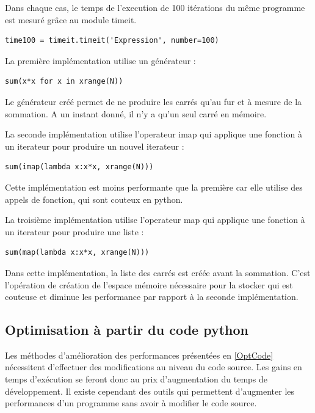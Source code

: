 \documentclass[a4paper]{article}
\begin{document}
Dans chaque cas, le temps de l'execution de 100 itérations du même programme est mesuré grâce au module timeit.

\begin{verbatim}
time100 = timeit.timeit('Expression', number=100)
\end{verbatim}

La première implémentation utilise un générateur :

\begin{verbatim}
sum(x*x for x in xrange(N))
\end{verbatim}

Le générateur créé permet de ne produire les carrés qu'au fur et à mesure de la sommation. A un instant donné, il n'y a qu'un seul carré en mémoire.


La seconde implémentation utilise l'operateur imap qui applique une fonction à un iterateur pour produire un nouvel iterateur :

\begin{verbatim}
sum(imap(lambda x:x*x, xrange(N)))
\end{verbatim}

Cette implémentation est moins performante que la première car elle utilise des appels de fonction, qui sont couteux en python.


La troisième implémentation utilise l'operateur map qui applique une fonction à un iterateur pour produire une liste :

\begin{verbatim}
sum(map(lambda x:x*x, xrange(N)))
\end{verbatim}

Dans cette implémentation, la liste des carrés est créée avant la sommation. C'est l'opération de création de l'espace mémoire nécessaire pour la stocker qui est couteuse et diminue les performance par rapport à la seconde implémentation.

\subsection{Optimisation à partir du code python}

Les méthodes d'amélioration des performances présentées en \ref{OptCode} nécessitent d'effectuer des modifications au niveau du code source. Les gains en temps d'exécution se feront donc au prix d'augmentation du temps de développement. Il existe cependant des outils qui permettent d'augmenter les performances d'un programme sans avoir à modifier le code source.
\end{document}
